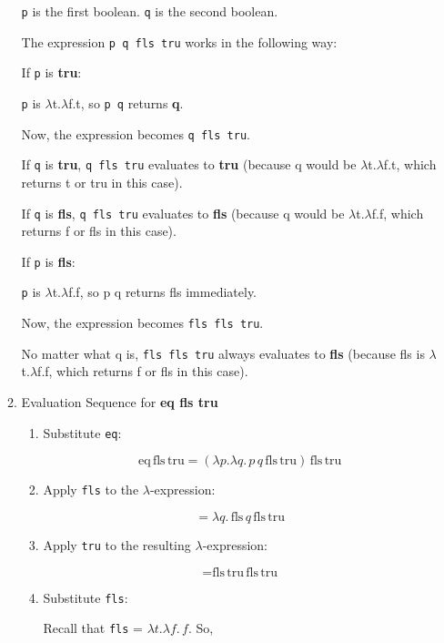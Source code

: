 \documentclass{article}
\begin{document}
\begin{enumerate}
\begin{enumerate}
    \texttt{p} is the first boolean.
    \texttt{q} is the second boolean.

    The expression \texttt{p q fls tru} works in the following way:

    If \texttt{p} is \textbf{tru}:
    
    \texttt{p} is $\lambda$t.$\lambda$f.t, so \texttt{p q} returns \textbf{q}.
    
    Now, the expression becomes \texttt{q  fls  tru}.
    
    If \texttt{q} is \textbf{tru}, \texttt{q  fls  tru} evaluates to \textbf{tru} (because q would be $\lambda$t.$\lambda$f.t, which returns t or tru in this case).
    
    If \texttt{q} is \textbf{fls}, \texttt{q  fls  tru} evaluates to \textbf{fls} (because q would be $\lambda$t.$\lambda$f.f, which returns f or fls in this case).

    
    If \texttt{p} is \textbf{fls}:
    
    \texttt{p} is $\lambda$t.$\lambda$f.f, so p q returns fls immediately.
    
    Now, the expression becomes \texttt{fls fls tru}.
    
    No matter what q is, \texttt{fls fls tru} always evaluates to \textbf{fls} (because fls is $\lambda$t.$\lambda$f.f, which returns f or fls in this case).

    \item Evaluation Sequence for \textbf{eq fls tru}

    \begin{enumerate}
        \item Substitute \texttt{eq}:

\[
\text{eq} \, \text{fls} \, \text{tru} = (\lambda p. \lambda q. \, p \, q \, \text{fls} \, \text{tru}) \, \text{fls} \, \text{tru}
\]

        \item Apply \texttt{fls} to the $\lambda$-expression:

\[
= \lambda q. \, \text{fls} \, q \, \text{fls} \, \text{tru}
\]

        \item Apply \texttt{tru} to the resulting $\lambda$-expression:

\[
= \text{fls} \, \text{tru} \, \text{fls} \, \text{tru}
\]

        \item Substitute \texttt{fls}:

         Recall that \texttt{fls} = $\lambda t. \lambda f. \, f$. So,


\end{enumerate}
\end{enumerate}
\end{enumerate}
\end{document}
